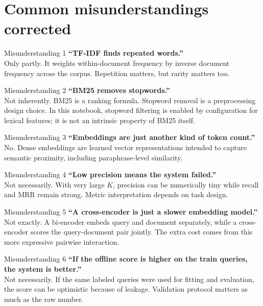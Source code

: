 \documentclass[10pt]{article}
\begin{document}
\section{Common misunderstandings corrected}
\label{sec:mis}

\begin{termcard*}{Misunderstanding 1}
\textbf{``TF-IDF finds repeated words.''}\\
Only partly. It weights within-document frequency by inverse document frequency across the corpus. Repetition matters, but rarity matters too.
\end{termcard*}

\begin{termcard*}{Misunderstanding 2}
\textbf{``BM25 removes stopwords.''}\\
Not inherently. BM25 is a ranking formula. Stopword removal is a preprocessing design choice. In this notebook, stopword filtering is enabled by configuration for lexical features; it is not an intrinsic property of BM25 itself.
\end{termcard*}

\begin{termcard*}{Misunderstanding 3}
\textbf{``Embeddings are just another kind of token count.''}\\
No. Dense embeddings are learned vector representations intended to capture semantic proximity, including paraphrase-level similarity.
\end{termcard*}

\begin{termcard*}{Misunderstanding 4}
\textbf{``Low precision means the system failed.''}\\
Not necessarily. With very large \(K\), precision can be numerically tiny while recall and MRR remain strong. Metric interpretation depends on task design.
\end{termcard*}

\begin{termcard*}{Misunderstanding 5}
\textbf{``A cross-encoder is just a slower embedding model.''}\\
Not exactly. A bi-encoder embeds query and document separately, while a cross-encoder scores the query-document pair jointly. The extra cost comes from this more expressive pairwise interaction.
\end{termcard*}

\begin{termcard*}{Misunderstanding 6}
\textbf{``If the offline score is higher on the train queries, the system is better.''}\\
Not necessarily. If the same labeled queries were used for fitting and evaluation, the score can be optimistic because of leakage. Validation protocol matters as much as the raw number.
\end{termcard*}
\end{document}
